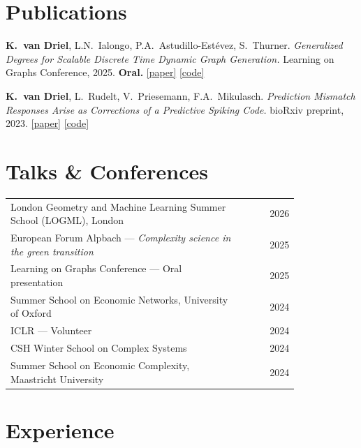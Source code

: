 \documentclass[10pt,a4paper]{article}
\begin{document}
\section{Publications}

{\small
\textbf{K.~van Driel}, L.N.~Ialongo, P.A.~Astudillo-Estévez, S.~Thurner.
\textit{Generalized Degrees for Scalable Discrete Time Dynamic Graph Generation.}
Learning on Graphs Conference, 2025. \textbf{Oral.}
\href{https://openreview.net/forum?id=yVJXsCC8NY}{[paper]}
\href{https://github.com/KjartanvanDriel/GenDeg}{[code]}
}

\vspace{0.22em}

{\small
\textbf{K.~van Driel}, L.~Rudelt, V.~Priesemann, F.A.~Mikulasch.
\textit{Prediction Mismatch Responses Arise as Corrections of a Predictive Spiking Code.}
bioRxiv preprint, 2023.
\href{https://www.biorxiv.org/content/10.1101/2023.11.16.567335v1}{[paper]}
\href{https://github.com/Priesemann-Group/prediction_mismatch}{[code]}
}

\section{Talks \& Conferences}

{\small
\begin{tabular}{@{}p{0.82\linewidth}r@{}}
London Geometry and Machine Learning Summer School (LOGML), London & \color{light}2026\\[0.1em]
European Forum Alpbach --- \textit{Complexity science in the green transition} & \color{light}2025\\[0.1em]
Learning on Graphs Conference --- Oral presentation & \color{light}2025\\[0.1em]
Summer School on Economic Networks, University of Oxford & \color{light}2024\\[0.1em]
ICLR --- Volunteer & \color{light}2024\\[0.1em]
CSH Winter School on Complex Systems & \color{light}2024\\[0.1em]
Summer School on Economic Complexity, Maastricht University & \color{light}2024\\
\end{tabular}
}

\section{Experience}
\end{document}

